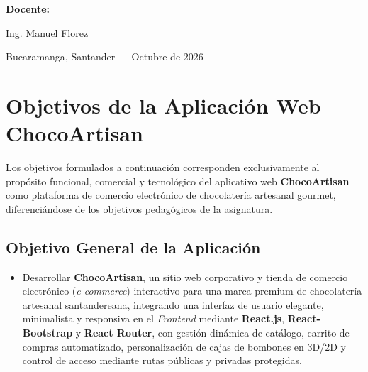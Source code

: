 \documentclass[12pt,letterpaper]{article}
\begin{document}
\begin{titlepage}
  \vfill
  {\large\textbf{Docente:}\par}
  {\large Ing. Manuel Florez\par}
  \vspace{0.5cm}
  {\normalsize Bucaramanga, Santander — Octubre de 2026\par}
\end{titlepage}

\tableofcontents
\newpage

\section{Objetivos de la Aplicación Web ChocoArtisan}

\begin{tcolorbox}[colback=cremacacao,colframe=doradoimperial,title=\textbf{Nota Aclaratoria sobre el Alcance de los Objetivos},coltitle=cacaooscuro,fonttitle=\bfseries]
Los objetivos formulados a continuación corresponden exclusivamente al propósito funcional, comercial y tecnológico del aplicativo web \textbf{ChocoArtisan} como plataforma de comercio electrónico de chocolatería artesanal gourmet, diferenciándose de los objetivos pedagógicos de la asignatura.
\end{tcolorbox}

\subsection{Objetivo General de la Aplicación}
\begin{itemize}[leftmargin=1.2cm]
  \item Desarrollar \textbf{ChocoArtisan}, un sitio web corporativo y tienda de comercio electrónico (\textit{e-commerce}) interactivo para una marca premium de chocolatería artesanal santandereana, integrando una interfaz de usuario elegante, minimalista y responsiva en el \textit{Frontend} mediante \textbf{React.js}, \textbf{React-Bootstrap} y \textbf{React Router}, con gestión dinámica de catálogo, carrito de compras automatizado, personalización de cajas de bombones en 3D/2D y control de acceso mediante rutas públicas y privadas protegidas.
\end{itemize}
\end{document}
